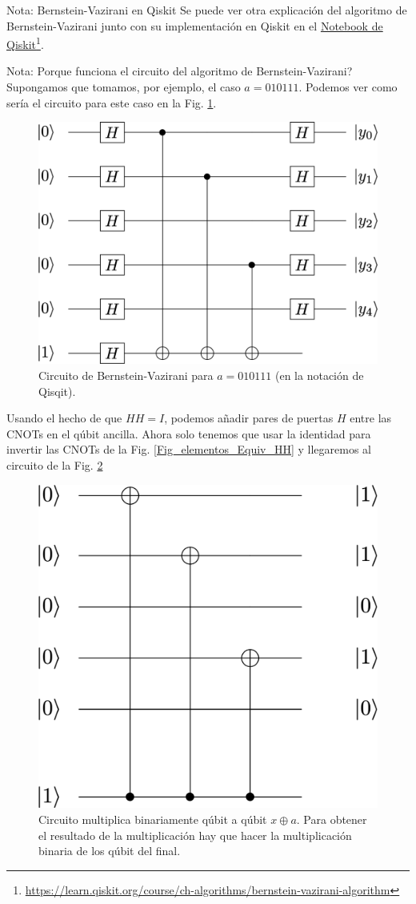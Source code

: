 \documentclass[a4paper,11pt]{book} %
\numberwithin{equation}{chapter}
\begin{document}
	\begin{mybox_blue}{Nota: Bernstein-Vazirani en Qiskit}
	Se puede ver otra explicación del algoritmo de  Bernstein-Vazirani junto con su implementación en Qiskit en el \href{https://learn.qiskit.org/course/ch-algorithms/bernstein-vazirani-algorithm}{Notebook de Qiskit}\footnote{\url{https://learn.qiskit.org/course/ch-algorithms/bernstein-vazirani-algorithm}}.
	
	\end{mybox_blue}
	
	\begin{mybox_blue}{Nota: Porque funciona el circuito del algoritmo de Bernstein-Vazirani?}
	Supongamos que tomamos, por ejemplo, el caso $a=010111$. Podemos ver como sería el circuito para este caso en la Fig. \ref{Fig_algoritmos_BV_circuit}.
		\begin{figure}[H]
			\centering 
			\includegraphics[width=0.3\linewidth]{Figuras/Fig_algoritmos_BV_circuit.png}
			\caption{Circuito de Bernstein-Vazirani para $a=010111$ (en la notación de Qisqit).}
			\label{Fig_algoritmos_BV_circuit}
			\end{figure}	
	
	Usando el hecho de que $HH=I$, podemos añadir pares de puertas $H$ entre las CNOTs en el qúbit ancilla. Ahora solo tenemos que usar la identidad para invertir las CNOTs
	de la Fig. \ref{Fig_elementos_Equiv_HH} y llegaremos al circuito de la Fig. \ref{Fig_algoritmos_Bernstein_Vazirani_trick}
	
		\begin{figure}[H]
		\centering 
		\includegraphics[width=0.3\linewidth]{Figuras/Fig_algoritmos_Bernstein_Vazirani_trick.png}
		\caption{Circuito multiplica binariamente qúbit a qúbit $x \oplus a$. Para obtener el resultado de la multiplicación hay que hacer la multiplicación binaria de los qúbit del final.}
		\label{Fig_algoritmos_Bernstein_Vazirani_trick}
		\end{figure}
	
	
	\end{mybox_blue}
\end{document}
